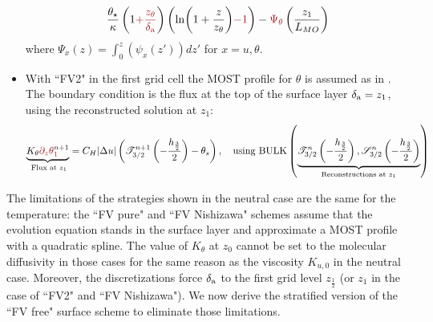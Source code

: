 \begin{itemize}
\begin{equation}
\begin{aligned}
			\frac{\theta_\star}{\kappa}
			\left(1\emphase{+\frac{z_\theta}
					{\delta_{\rm a}}}\right)
		\left(\ln(1+\frac{z}{z_\theta})\emphase{-1}\right)
		- \emphase{\Psi_\theta}\left(\frac{z_1}{L_{MO}}\right)
		\end{aligned}
		\end{equation}
		where $\Psi_x(z) = \int_0^z (\psi_x(z'))dz'$
		for $x=u,\theta$.
	\item With ``FV2" in the first grid cell
		the MOST profile for $\theta$ is assumed as in
		\citep{nishizawa_surface_2018}.
		The boundary condition is the flux at the top of the
		surface layer $\delta_{\rm a}=z_1$,
		using the reconstructed solution at $z_1$:
		\begin{equation}
			\underbrace{K_\theta
			\emphase{\partial_z \theta}^{n+1}_\emphase{1}}_{\text{
				Flux at
			} z_1} =
			C_H|\Delta u|\left(
			{\cal T}_{3/2}^{n+1}
			\left(-\frac{h_\frac{3}{2}}{2}\right)
			- \theta_s\right),
			~~~ \text{using } {\rm BULK}
			\left(\underbrace{{\cal T}_{3/2}^{n}
			\left(-\frac{h_\frac{3}{2}}{2}\right),
			{\cal S}_{3/2}^{n}
			\left(-\frac{h_\frac{3}{2}}{2}\right)}_{
			\text{Reconstructions at } z_1 }\right)
		\end{equation}
\end{itemize}
The limitations of the strategies shown in the neutral case are the
same for the temperature: the ``FV pure" and ``FV Nishizawa" schemes
assume that the evolution equation stands
in the surface layer and approximate a MOST profile with
a quadratic spline.
The value of $K_\theta$ at $z_0$ cannot be set to the molecular
diffusivity in those cases for the same reason as the
viscosity $K_{u,0}$ in the neutral case.
%
Moreover, the discretizations force $\delta_{\rm a}$ to the first
grid level $z_{\frac{1}{2}}$ (or $z_1$ in the case of ``FV2" and
``FV Nishizawa").
We now derive the stratified version of the ``FV free" surface scheme
to eliminate those limitations.
